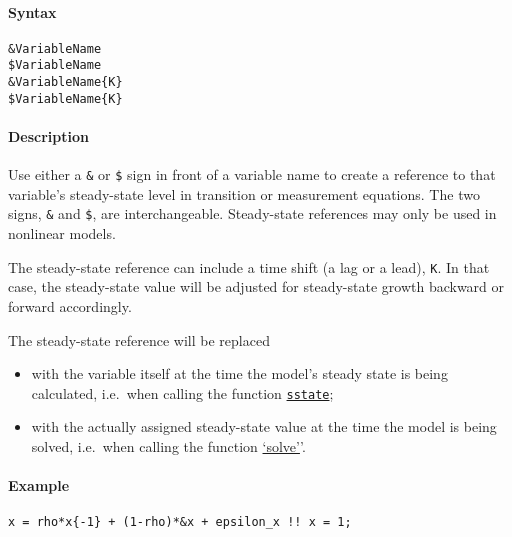 


	\paragraph{Syntax}\label{syntax}

\begin{verbatim}
&VariableName
$VariableName
&VariableName{K}
$VariableName{K}
\end{verbatim}

\paragraph{Description}\label{description}

Use either a \texttt{\&} or \texttt{\$} sign in front of a variable name
to create a reference to that variable's steady-state level in
transition or measurement equations. The two signs, \texttt{\&} and
\texttt{\$}, are interchangeable. Steady-state references may only be
used in nonlinear models.

The steady-state reference can include a time shift (a lag or a lead),
\texttt{K}. In that case, the steady-state value will be adjusted for
steady-state growth backward or forward accordingly.

The steady-state reference will be replaced

\begin{itemize}
\item
  with the variable itself at the time the model's steady state is being
  calculated, i.e.~when calling the function
  \href{model/sstate}{\texttt{sstate}};
\item
  with the actually assigned steady-state value at the time the model is
  being solved, i.e.~when calling the function
  \href{model/solve}{`solve'}'.
\end{itemize}

\paragraph{Example}\label{example}

\begin{verbatim}
x = rho*x{-1} + (1-rho)*&x + epsilon_x !! x = 1;
\end{verbatim}



